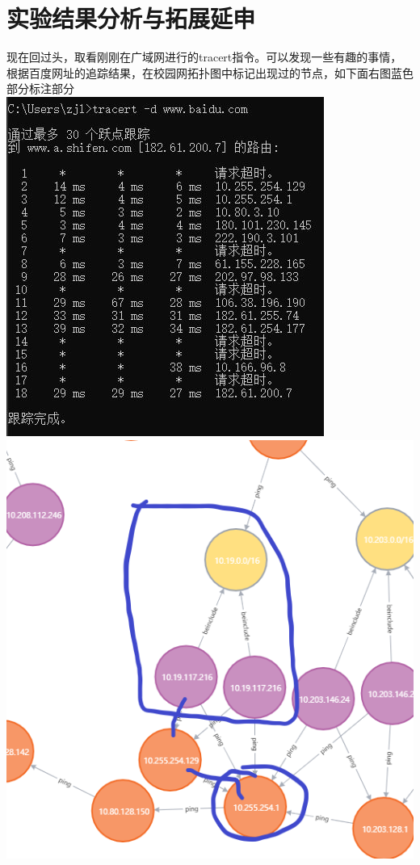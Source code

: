 \documentclass{article} %
\begin{document}
    \section{\LARGE 实验结果分析与拓展延申}
    \par 现在回过头，取看刚刚在广域网进行的tracert指令。可以发现一些有趣的事情，
    根据百度网址的追踪结果，在校园网拓扑图中标记出现过的节点，如下面右图蓝色部分标注部分\\
    \includegraphics[scale=0.5]{pic/教一追踪百度.JPG} \includegraphics[scale=0.7]{pic/东南大学网络拓扑图.png}
\end{document}
